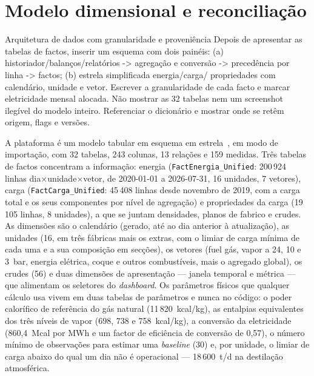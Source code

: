 \section{Modelo dimensional e reconciliação}
\label{sec:modelo-dimensional}
{Arquitetura de dados com granularidade e proveniência}
{Depois de apresentar as tabelas de factos, inserir um esquema com dois
painéis: (a) historiador/balanços/relatórios -\textgreater{} agregação e conversão -\textgreater{}
precedência por linha -\textgreater{} factos; (b) estrela simplificada energia/carga/
propriedades com calendário, unidade e vetor. Escrever a granularidade
de cada facto e marcar eletricidade mensal alocada. Não mostrar as 32
tabelas nem um screenshot ilegível do modelo inteiro. Referenciar o
dicionário e mostrar onde se retêm origem, flags e versões.}%

A plataforma é um modelo tabular em esquema em estrela~\cite{KimballRoss2013}, em modo de
importação, com 32 tabelas, 243 colunas, 13 relações e 159 medidas.
Três tabelas de factos concentram a informação: energia
(\texttt{FactEnergia\_Unified}: 200\,924 linhas dia$\times$unidade$\times$vetor,
de 2020-01-01 a 2026-07-31, 16 unidades, 7 vetores), carga
(\texttt{FactCarga\_Unified}: 45\,408 linhas desde novembro de 2019, com a
carga total e os seus componentes por nível de agregação) e propriedades
da carga (19\,105 linhas, 8 unidades), a que se juntam densidades, planos
de fabrico e crudes. As dimensões são o calendário (gerado, até ao dia
anterior à atualização), as unidades (16, em três fábricas mais os
extras, com o limiar de carga mínima de cada uma e a sua composição em
secções), os vetores (fuel gás, vapor a 24, 10 e 3~bar, energia
elétrica, coque e outros combustíveis, mais o agregado global), os crudes
(56) e duas dimensões de apresentação --- janela temporal e métrica ---
que alimentam os seletores do \emph{dashboard}. Os parâmetros físicos que
qualquer cálculo usa vivem em duas tabelas de parâmetros e nunca no
código: o poder calorífico de referência do gás natural
(11\,820~kcal/kg), as entalpias equivalentes dos três níveis de vapor
(698, 738 e 758~kcal/kg), a conversão da eletricidade (860,4~Mcal por MWh e um
factor de eficiência de conversão de 0,57), o número mínimo de
observações para estimar uma \emph{baseline} (30) e, por unidade, o limiar
de carga abaixo do qual um dia não é operacional --- 18\,600~t/d na
destilação atmosférica.

